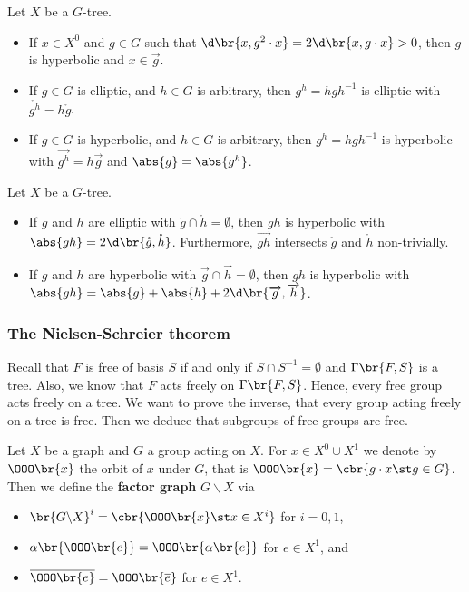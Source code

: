 \begin{exercise}
Let $ X $ be a $ G $-tree.
\begin{itemize}
\item If $ x \in X^0 $ and $ g \in G $ such that $ \d\br{x, g^2 \cdot x} = 2\d\br{x, g \cdot x} > 0 $, then $ g $ is hyperbolic and $ x \in \overrightarrow{g} $.
\item If $ g \in G $ is elliptic, and $ h \in G $ is arbitrary, then $ g^h = hgh^{-1} $ is elliptic with $ \mathring{g^h} = h\mathring{g} $.
\item If $ g \in G $ is hyperbolic, and $ h \in G $ is arbitrary, then $ g^h = hgh^{-1} $ is hyperbolic with $ \overrightarrow{g^h} = h\overrightarrow{g} $ and $ \abs{g} = \abs{g^h} $.
\end{itemize}
\end{exercise}

\begin{proposition}
Let $ X $ be a $ G $-tree.
\begin{itemize}
\item If $ g $ and $ h $ are elliptic with $ \mathring{g} \cap \mathring{h} = \emptyset $, then $ gh $ is hyperbolic with $ \abs{gh} = 2\d\br{\mathring{g}, \mathring{h}} $. Furthermore, $ \overrightarrow{gh} $ intersects $ \mathring{g} $ and $ \mathring{h} $ non-trivially.
\item If $ g $ and $ h $ are hyperbolic with $ \overrightarrow{g} \cap \overrightarrow{h} = \emptyset $, then $ gh $ is hyperbolic with $ \abs{gh} = \abs{g} + \abs{h} + 2\d\br{\overrightarrow{g}, \overrightarrow{h}} $.
\end{itemize}
\end{proposition}

\subsubsection{The Nielsen-Schreier theorem}

Recall that $ F $ is free of basis $ S $ if and only if $ S \cap S^{-1} = \emptyset $ and $ \Gamma\br{F, S} $ is a tree. Also, we know that $ F $ acts freely on $ \Gamma\br{F, S} $. Hence, every free group acts freely on a tree. We want to prove the inverse, that every group acting freely on a tree is free. Then we deduce that subgroups of free groups are free.

\begin{definition}
Let $ X $ be a graph and $ G $ a group acting on $ X $. For $ x \in X^0 \cup X^1 $ we denote by $ \OOO\br{x} $ the orbit of $ x $ under $ G $, that is $ \OOO\br{x} = \cbr{g \cdot x \st g \in G} $. Then we define the \textbf{factor graph} $ G \backslash X $ via
\begin{itemize}
\item $ \br{G \backslash X}^i = \cbr{\OOO\br{x} \st x \in X^i} $ for $ i = 0, 1 $,
\item $ \alpha\br{\OOO\br{e}} = \OOO\br{\alpha\br{e}} $ for $ e \in X^1 $, and
\item $ \overline{\OOO\br{e}} = \OOO\br{\overline{e}} $ for $ e \in X^1 $.
\end{itemize}
\end{definition}

